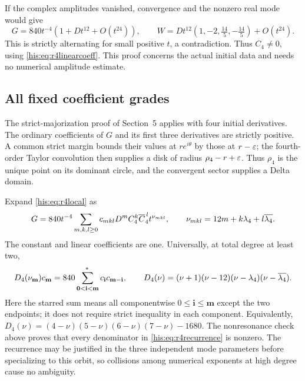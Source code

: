 If the complex amplitudes vanished, convergence and the nonzero real mode would give
\[
 G=840t^{-4}(1+Dt^{12}+O(t^{24})),\qquad
 W=Dt^{12}\left(1,-2,\tfrac{14}5,-\tfrac{14}5\right)+O(t^{24}).
\]
This is strictly alternating for small positive $t$, a contradiction. Thus $C_4\ne0$, using \eqref{his:eq:r4linearcoeff}. This proof concerns the actual initial data and needs no numerical amplitude estimate.

\subsection{All fixed coefficient grades}\label{his:sec:r4grades}
The strict-majorization proof of Section~5 applies with four initial derivatives. The ordinary coefficients of $G$ and its first three derivatives are strictly positive. A common strict margin bounds their values at $re^{i\theta}$ by those at $r-\varepsilon$; the fourth-order Taylor convolution then supplies a disk of radius $\rho_4-r+\varepsilon$. Thus $\rho_4$ is the unique point on its dominant circle, and the convergent sector supplies a Delta domain.

Expand \eqref{his:eq:r4local} as
\begin{equation}\label{his:eq:r4triple}
 G=840t^{-4}\sum_{m,k,l\ge0}c_{mkl}D^mC_4^k\overline C_4^{\,l}t^{\nu_{mkl}},
 \qquad \nu_{mkl}=12m+k\lambda_4+l\overline{\lambda_4}.
\end{equation}
The constant and linear coefficients are one. Universally, at total degree at least two,
\begin{equation}\label{his:eq:r4recurrence}
 D_4(\nu_{\mathbf m})c_{\mathbf m}
 =840\sum_{\mathbf0<\mathbf i<\mathbf m}^{\!*}c_{\mathbf i}c_{\mathbf m-\mathbf i},
 \qquad
 D_4(\nu)=(\nu+1)(\nu-12)(\nu-\lambda_4)(\nu-\overline{\lambda_4}).
\end{equation}
Here the starred sum means all componentwise $0\le\mathbf i\le\mathbf m$ except the two endpoints; it does not require strict inequality in each component. Equivalently, $D_4(\nu)=(4-\nu)(5-\nu)(6-\nu)(7-\nu)-1680$. The nonresonance check above proves that every denominator in \eqref{his:eq:r4recurrence} is nonzero. The recurrence may be justified in the three independent mode parameters before specializing to this orbit, so collisions among numerical exponents at high degree cause no ambiguity.


